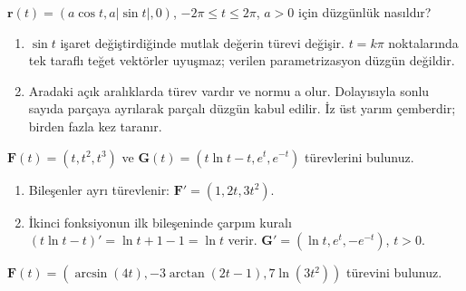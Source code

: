 \begin{tcolorbox}[title={Örnek 3.6 | Parçalı düzgün eğri},colframe=accent]\(\mathbf r(t)=(a\cos t,a|\sin t|,0)\), \(-2\pi\le t\le2\pi\), \(a>0\) için düzgünlük nasıldır?
\par{}\end{tcolorbox}
\begin{tcolorbox}[title={Adım adım çözüm},colback=green!3!white,colframe=green]\begin{enumerate}
\item \(\sin t\) işaret değiştirdiğinde mutlak değerin türevi değişir. \(t=k\pi\) noktalarında tek taraflı teğet vektörler uyuşmaz; verilen parametrizasyon düzgün değildir.
\item Aradaki açık aralıklarda türev vardır ve normu a olur. Dolayısıyla sonlu sayıda parçaya ayrılarak parçalı düzgün kabul edilir. İz üst yarım çemberdir; birden fazla kez taranır.
\end{enumerate}\end{tcolorbox}
\begin{tcolorbox}[title={Örnek 3.7 | Dersteki temel türevler},colframe=accent]\(\mathbf F(t)=(t,t^2,t^3)\) ve \(\mathbf G(t)=(t\ln t-t,e^t,e^{-t})\) türevlerini bulunuz.
\par{}\end{tcolorbox}
\begin{tcolorbox}[title={Adım adım çözüm},colback=green!3!white,colframe=green]\begin{enumerate}
\item Bileşenler ayrı türevlenir: \(\mathbf F\prime=(1,2t,3t^2)\).
\item İkinci fonksiyonun ilk bileşeninde çarpım kuralı \((t\ln t-t)\prime=\ln t+1-1=\ln t\) verir. \(\mathbf G\prime=(\ln t,e^t,-e^{-t})\), \(t>0\).
\end{enumerate}\end{tcolorbox}
\begin{tcolorbox}[title={Örnek 3.8 | Zincir kuralı içeren vektör türevi},colframe=accent]\(\mathbf F(t)=(\arcsin(4t),-3\arctan(2t-1),7\ln(3t^2))\) türevini bulunuz.
\par{}\end{tcolorbox}
